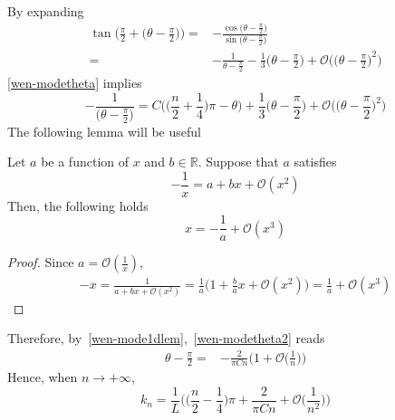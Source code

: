 By expanding
\begin{equation*}
\begin{split}
\tan\Big(\frac{\pi}{2} + \big(\theta - \frac \pi 2 \big) \Big) = &
- \frac{\cos\big(\theta-\frac{\pi}{2}\big)}{\sin\big(\theta-\frac{\pi}{2}\big)} \\
= & 
-\frac{1}{\theta - \frac \pi 2 } - \frac{1}{3}\big(\theta - \frac{\pi}{2}\big) + \mathcal{O}\Big(\big(\theta - \frac \pi 2 \big)^2\Big)
\end{split}
\end{equation*}
\cref{wen-modetheta} implies
\begin{equation}\label{wen-modetheta2}
-\frac{1}{\big(\theta - \frac \pi 2\big)} = 
C\Big( \big(\frac n 2 + \frac 1 4 \big)\pi - \theta \Big) +  \frac{1}{3}\big(\theta - \frac{\pi}{2}\big) + \mathcal{O}\Big(\big(\theta - \frac \pi 2 \big)^2\Big)
\end{equation}
The following lemma will be useful
\begin{lemma}\label{wen-mode1dlem}
Let $a$ be a function of $x$ and $b \in\mathbb{R}$.
Suppose that $a $ satisfies
\begin{equation*}
-\frac 1 x = a + bx + \mathcal{O}(x^2)
\end{equation*}
Then, the following holds
\begin{equation*}
x = -\frac 1 a + \mathcal{O}(x^3)
\end{equation*}
\end{lemma}
\begin{proof}
Since $a = \mathcal{O}(\frac 1 x) $, 
\begin{equation*}
\begin{split}
-x =  \frac{1}{a + bx + \mathcal{O}(x^2)} 
= \frac 1 a \big(1 + \frac b a x + \mathcal{O}(x^2)\big) 
=  \frac 1 a +  \mathcal{O}(x^3)
\end{split}
\end{equation*}
\end{proof}
Therefore, by~\cref{wen-mode1dlem},~\cref{wen-modetheta2} reads
\begin{equation*}
\begin{split}
\theta - \frac{\pi}{ 2} = &  -\frac{2}{\pi C n}\Big( 1 + \mathcal{O}\big( \frac{ 1}{ n}\big) \Big)
\end{split}
\end{equation*}
Hence, when $n\rightarrow +\infty$, 
\begin{equation*}
k_n = \frac 1 L \Big( \big( \frac n 2 - \frac 1 4 \big)\pi + \frac{2}{\pi C n}+ \mathcal{O}\big(\frac{1}{n^2}\big) \Big)
\end{equation*}
